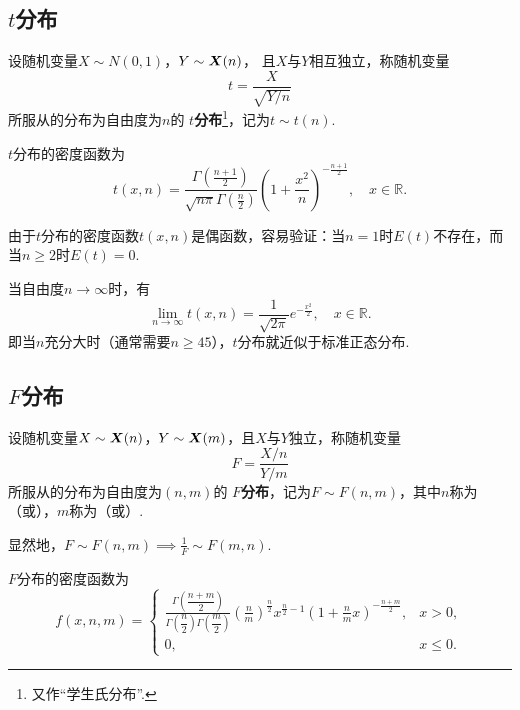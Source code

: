 \subsection{\texorpdfstring{\(t\)分布}{t分布}}
\begin{definition}
设随机变量\(X \sim N(0,1)\)，\(Y \sim \boldsymbol{X}(n)\)，%
且\(X\)与\(Y\)相互独立，称随机变量\[
t = \frac{X}{\sqrt{Y/n}}
\]所服从的分布为自由度为\(n\)的 \textbf{ \(t\)分布}\footnote{又作“学生氏分布”.}，记为\(t \sim t(n)\).
\end{definition}

\begin{theorem}\label{theorem:数理统计的基础知识.学生氏分布的密度函数}
\(t\)分布的密度函数为\[
t(x,n) = \frac{ \Gamma\left(\frac{n+1}{2}\right) }{ \sqrt{n\pi} \Gamma\left(\frac{n}{2}\right) } \left(1+\frac{x^2}{n}\right)^{-\frac{n+1}{2}},
\quad x \in \mathbb{R}.
\]
\end{theorem}

由于\(t\)分布的密度函数\(t(x,n)\)是偶函数，容易验证：当\(n=1\)时\(E(t)\)不存在，而当\(n \geqslant 2\)时\(E(t)=0\).

当自由度\(n\to\infty\)时，有\[
\lim\limits_{n\to\infty} t(x,n) = \frac{1}{\sqrt{2\pi}} e^{-\frac{x^2}{2}},
\quad x \in \mathbb{R}.
\]即当\(n\)充分大时（通常需要\(n \geqslant 45\)），\(t\)分布就近似于标准正态分布.

\subsection{\texorpdfstring{\(F\)分布}{F分布}}
\begin{definition}
设随机变量\(X \sim \boldsymbol{X}(n)\)，\(Y \sim \boldsymbol{X}(m)\)，且\(X\)与\(Y\)独立，称随机变量\[
F=\frac{X/n}{Y/m}
\]所服从的分布为自由度为\((n,m)\)的 \textbf{ \(F\)分布}，记为\(F \sim F(n,m)\)，其中\(n\)称为（或），\(m\)称为（或）.
\end{definition}

显然地，\(F \sim F(n,m) \implies \frac{1}{F} \sim F(m,n)\).

\begin{theorem}
\(F\)分布的密度函数为\[
f(x,n,m) = \left\{ \begin{array}{cl}
\frac{\Gamma\left(\dfrac{n+m}{2}\right)}{\Gamma\left(\dfrac{n}{2}\right) \Gamma\left(\dfrac{m}{2}\right)} \left(\frac{n}{m}\right)^{\frac{n}{2}} x^{\frac{n}{2}-1} \left(1+\frac{n}{m}x\right)^{-\frac{n+m}{2}}, & x > 0, \\
0, & x \leqslant 0.
\end{array} \right.
\]
\end{theorem}

